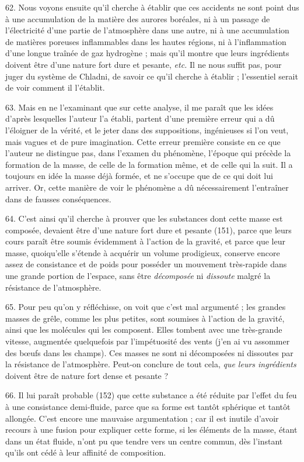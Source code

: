 \documentclass[a4paper, 11pt, oneside, polutonikogreek, french]{article}
\begin{document}
62. Nous voyons ensuite qu'il cherche à établir que ces accidents ne sont point dus à une accumulation de la matière des aurores boréales, ni à un passage de l'électricité d'une partie de l'atmosphère dans une autre, ni à une accumulation de matières poreuses inflammables dans les hautes régions, ni à l'inflammation d'une longue traînée de gaz hydrogène ; mais qu'il montre que leurs ingrédients doivent être d'une nature fort dure et pesante, \emph{etc.} Il ne nous suffit pas, pour juger du système de Chladni, de savoir ce qu'il cherche à établir ; l'essentiel serait de voir comment il l'établit.

63. Mais en ne l'examinant que sur cette analyse, il me paraît que les idées d'après lesquelles l'auteur l'a établi, partent d'une première erreur qui a dû l'éloigner de la vérité, et le jeter dans des suppositions, ingénieuses si l'on veut, mais vagues et de pure imagination. Cette erreur première consiste en ce que l'auteur ne distingue pas, dans l'examen du phénomène, l'époque qui précède la formation de la masse, de celle de la formation même, et de celle qui la suit. Il a toujours en idée la masse déjà formée, et ne s'occupe que de ce qui doit lui arriver. Or, cette manière de voir le phénomène a dû nécessairement l'entraîner dans de fausses conséquences.

64. C'est ainsi qu'il cherche à prouver \og que les substances dont cette masse est composée, devaient être d'une nature fort dure et pesante (151), parce que leurs cours paraît être soumis évidemment à l'action de la gravité, et parce que leur masse, quoiqu'elle s'étende à acquérir un volume prodigieux, conserve encore assez de consistance et de poids pour posséder un mouvement très-rapide dans une grande portion de l'espace, sans être \emph{décomposée} ni \emph{dissoute} malgré la résistance de l'atmosphère. \fg

65. Pour peu qu'on y réfléchisse, on voit que c'est mal argumenté ; les grandes masses de grêle, comme les plus petites, sont soumises à l'action de la gravité, ainsi que les molécules qui les composent. Elles tombent avec une très-grande vitesse, augmentée quelquefois par l'impétuosité des vents (j'en ai vu assommer des bœufs dans les champs). Ces masses ne sont ni décomposées ni dissoutes par la résistance de l'atmosphère. Peut-on conclure de tout cela, \emph{que leurs ingrédients} doivent être de nature fort dense et pesante ?

66. \og Il lui paraît probable (152) que cette substance a été réduite par l'effet du feu à une consistance demi-fluide, parce que sa forme est tantôt sphérique et tantôt allongée. \fg C'est encore une mauvaise argumentation ; car il est inutile d'avoir recours à une fusion pour expliquer cette forme, si les éléments de la masse, étant dans un état fluide, n'ont pu que tendre vers un centre commun, dès l'instant qu'ils ont cédé à leur affinité de composition.
\end{document}
